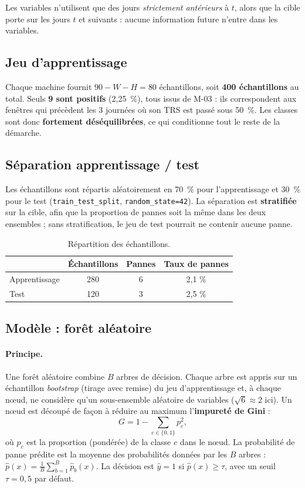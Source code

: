 \documentclass[11pt,a4paper]{article}
\newcommand{\code}[1]{\texttt{#1}}
\newcommand{\pct}[1]{#1~\%}
\begin{document}
Les variables n'utilisent que des jours \emph{strictement antérieurs} à $t$, alors que la cible
porte sur les jours $t$ et suivants : aucune information future n'entre dans les variables.

\subsection{Jeu d'apprentissage}
Chaque machine fournit $90 - W - H = 80$ échantillons, soit \textbf{400 échantillons} au total.
Seuls \textbf{9 sont positifs} (\pct{2,25}), tous issus de M-03 : ils correspondent aux fenêtres
qui précèdent les 3 journées où son TRS est passé sous \pct{50}. Les classes sont donc
\textbf{fortement déséquilibrées}, ce qui conditionne tout le reste de la démarche.

\subsection{Séparation apprentissage / test}
Les échantillons sont répartis aléatoirement en \pct{70} pour l'apprentissage et \pct{30} pour
le test (\code{train\_test\_split}, \code{random\_state=42}). La séparation est
\textbf{stratifiée} sur la cible, afin que la proportion de pannes soit la même dans les deux
ensembles ; sans stratification, le jeu de test pourrait ne contenir aucune panne.

\begin{table}[ht]
\centering\small
\caption{Répartition des échantillons.}
\begin{tabular}{@{}lccc@{}}
\toprule
 & \textbf{Échantillons} & \textbf{Pannes} & \textbf{Taux de pannes} \\
\midrule
Apprentissage & 280 & 6 & 2,1 \% \\
Test          & 120 & 3 & 2,5 \% \\
\bottomrule
\end{tabular}
\end{table}

\subsection{Modèle : forêt aléatoire}
\paragraph{Principe.} Une forêt aléatoire combine $B$ arbres de décision. Chaque arbre est appris
sur un échantillon \emph{bootstrap} (tirage avec remise) du jeu d'apprentissage et, à chaque
nœud, ne considère qu'un sous-ensemble aléatoire de variables ($\sqrt{6} \approx 2$ ici). Un nœud
est découpé de façon à réduire au maximum l'\textbf{impureté de Gini} :
\begin{equation}
G = 1 - \sum_{c \in \{0,1\}} p_c^2 ,
\end{equation}
où $p_c$ est la proportion (pondérée) de la classe $c$ dans le nœud. La probabilité de panne
prédite est la moyenne des probabilités données par les $B$ arbres :
$\hat p(x) = \frac{1}{B}\sum_{b=1}^{B} \hat p_b(x)$. La décision est $\hat y = 1$ si
$\hat p(x) \ge \tau$, avec un seuil $\tau = 0{,}5$ par défaut.
\end{document}
